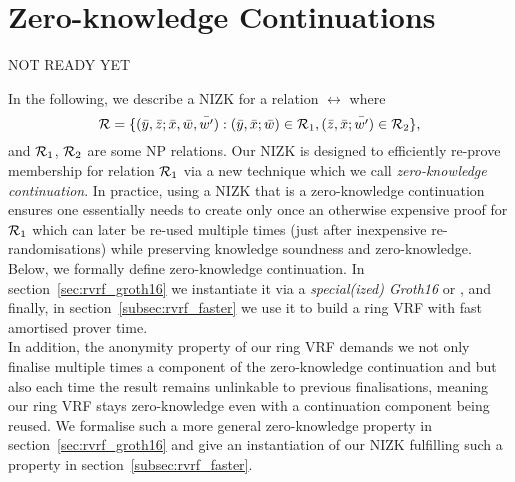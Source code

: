 \section{Zero-knowledge Continuations}
\label{sec:rvrf_cont}

NOT READY YET

\noindent In the following, we describe a NIZK for a relation $\rel$ where
$$\mathcal{R} = \{(\bar{y}, \bar{z}; \bar{x}, \bar{w}, \bar{w'}):  (\bar{y}, \bar{x}; \bar{w}) \in \mathcal{R}_1, (\bar{z}, \bar{x}; \bar{w'}) \in \mathcal{R}_2 \},$$
and $\mathcal{R}_1$, $\mathcal{R}_2$ are some NP relations. Our NIZK is designed to efficiently re-prove membership for relation $\mathcal{R}_1$
via a new technique which we call \emph{zero-knowledge continuation}. In practice, using a NIZK that is a zero-knowledge continuation 
ensures one essentially needs to create only once an otherwise expensive proof for $\mathcal{R}_1$ which can later be 
re-used multiple times (just after inexpensive re-randomisations) while preserving knowledge soundness and zero-knowledge. 
Below, we formally define zero-knowledge continuation. In section~\ref{sec:rvrf_groth16} we instantiate it via a \emph{special(ized) 
Groth16} or \SpecialG, and finally, in section~\ref{subsec:rvrf_faster} we use it to build a ring VRF with fast amortised prover time. \\

\noindent In addition, the anonymity property of our ring VRF demands we not only finalise multiple times a component of the zero-knowledge 
continuation and but also each time the result remains unlinkable to previous finalisations, meaning our ring VRF stays zero-knowledge 
even with a continuation component being reused. We formalise such a more general zero-knowledge property in 
section~\ref{sec:rvrf_groth16} and give an instantiation of our NIZK fulfilling such a property in section~\ref{subsec:rvrf_faster}. 


